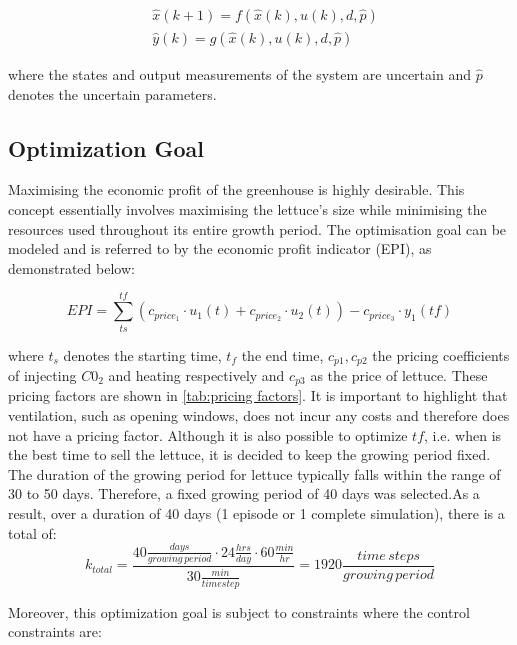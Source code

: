 \begin{equation}\label{eq:greenhouse_model_discrete_uncertain}
	\begin{aligned}
		& \hat x(k+1) = f(\hat x(k),u(k),d,\hat p) \\
		& \hat y(k) = g(\hat x(k),u(k),d,\hat p)
	\end{aligned}
\end{equation}

where the states and output measurements of the system are uncertain and $\hat{p}$ denotes the uncertain parameters.



\subsection{Optimization Goal}
\label{ssection:optimization-goal}
Maximising the economic profit of the greenhouse is highly desirable. This concept essentially involves maximising the lettuce's size while minimising the resources used throughout its entire growth period. The optimisation goal can be modeled and is referred to by the economic profit indicator (EPI), as demonstrated below:

\begin{equation}\label{eq:epi}
	EPI = \sum_{ts}^{tf} (c_{price_1} \cdot u_1(t) + c_{price_2} \cdot u_2(t)) - c_{price_3} \cdot y_1(tf)
\end{equation}

where $t_s$ denotes the starting time, $t_f$ the end time, $c_{p1},c_{p2}$ the pricing coefficients of injecting $C0_2$ and heating respectively and $c_{p3}$ as the price of lettuce. These pricing factors are shown in \autoref{tab:pricing factors}. It is important to highlight that ventilation, such as opening windows, does not incur any costs and therefore does not have a pricing factor. Although it is also possible to optimize $tf$, i.e. when is the best time to sell the lettuce, it is decided to keep the growing period fixed. The duration of the growing period for lettuce typically falls within the range of 30 to 50 days. Therefore, a fixed growing period of 40 days was selected.As a result, over a duration of 40 days (1 episode or 1 complete simulation), there is a total of:
$$
k_{total} = \frac{40 \frac{days}{growing \, period} \cdot 24 \frac{hrs}{day} \cdot 60 \frac{min}{hr}}{30 \frac{min}{timestep}} = 1920 \frac{time \, steps}{growing \, period}
$$

Moreover, this optimization goal is subject to constraints where the control constraints are:

